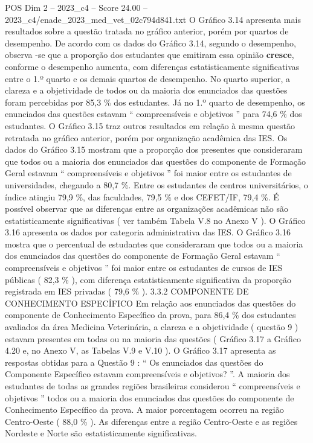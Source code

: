 \begin{textsample}{POS Dim 2 – 2023\_c4 – Score 24.00 – 2023\_c4/enade\_2023\_med\_vet\_02c794d841.txt}
O Gráfico 3.14 apresenta mais resultados sobre a questão tratada no gráfico anterior, porém por quartos de desempenho.
De acordo com os dados do Gráfico 3.14, segundo o desempenho, observa -se que a proporção dos estudantes que emitiram essa opinião \textbf{cresce}, conforme o desempenho aumenta, com diferenças estatisticamente significativas entre o 1.º quarto e os demais quartos de desempenho.
No quarto superior, a clareza e a objetividade de todos ou da maioria dos enunciados das questões foram percebidas por 85,3 \% dos estudantes.
Já no 1.º quarto de desempenho, os enunciados das questões estavam “ compreensíveis e objetivos ” para 74,6 \% dos estudantes.
O Gráfico 3.15 traz outros resultados em relação à mesma questão retratada no gráfico anterior, porém por organização acadêmica das IES.
Os dados do Gráfico 3.15 mostram que a proporção dos presentes que consideraram que todos ou a maioria dos enunciados das questões do componente de Formação Geral estavam “ compreensíveis e objetivos ” foi maior entre os estudantes de universidades, chegando a 80,7 \%.
Entre os estudantes de centros universitários, o índice atingiu 79,9 \%, das faculdades, 79,5 \% e dos CEFET/IF, 79,4 \%.
É possível observar que as diferenças entre as organizações acadêmicas não são estatisticamente significativas ( ver também Tabela V.8 no Anexo V ).
O Gráfico 3.16 apresenta os dados por categoria administrativa das IES.
O Gráfico 3.16 mostra que o percentual de estudantes que consideraram que todos ou a maioria dos enunciados das questões do componente de Formação Geral estavam “ compreensíveis e objetivos ” foi maior entre os estudantes de cursos de IES públicas ( 82,3 \% ), com diferença estatisticamente significativa da proporção registrada em IES privadas ( 79,6 \% ). 3.3.2 COMPONENTE DE CONHECIMENTO ESPECÍFICO Em relação aos enunciados das questões do componente de Conhecimento Específico da prova, para 86,4 \% dos estudantes avaliados da área Medicina Veterinária, a clareza e a objetividade ( questão 9 ) estavam presentes em todas ou na maioria das questões ( Gráfico 3.17 a Gráfico 4.20 e, no Anexo V, as Tabelas V.9 e V.10 ).
O Gráfico 3.17 apresenta as respostas obtidas para a Questão 9 : “ Os enunciados das questões do Componente Específico estavam compreensíveis e objetivos? ”.
A maioria dos estudantes de todas as grandes regiões brasileiras considerou “ compreensíveis e objetivos ” todos ou a maioria dos enunciados das questões do componente de Conhecimento Específico da prova.
A maior porcentagem ocorreu na região Centro-Oeste ( 88,0 \% ).
As diferenças entre a região Centro-Oeste e as regiões Nordeste e Norte são estatisticamente significativas.

\end{textsample}
